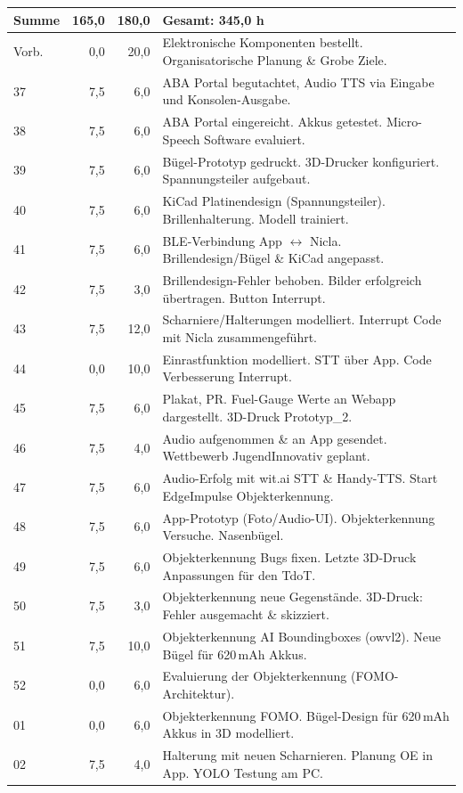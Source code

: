 \begin{longtable}{l r r p{\dimexpr\textwidth-4.5cm\relax}}
\hline
\textbf{Summe} & \textbf{165,0} & \textbf{180,0} & \textbf{Gesamt: 345,0 h} \\
\hline
\hline
\endlastfoot
Vorb. & 0,0 & 20,0 & Elektronische Komponenten bestellt. Organisatorische Planung \& Grobe Ziele. \\
37 & 7,5 & 6,0 & ABA Portal begutachtet, Audio TTS via Eingabe und Konsolen-Ausgabe. \\
38 & 7,5 & 6,0 & ABA Portal eingereicht. Akkus getestet. Micro-Speech Software evaluiert. \\
39 & 7,5 & 6,0 & Bügel-Prototyp gedruckt. 3D-Drucker konfiguriert. Spannungsteiler aufgebaut. \\
40 & 7,5 & 6,0 & KiCad Platinendesign (Spannungsteiler). Brillenhalterung. Modell trainiert. \\
41 & 7,5 & 6,0 & BLE-Verbindung App $\leftrightarrow$ Nicla. Brillendesign/Bügel \& KiCad angepasst. \\
42 & 7,5 & 3,0 & Brillendesign-Fehler behoben. Bilder erfolgreich übertragen. Button Interrupt. \\
43 & 7,5 & 12,0 & Scharniere/Halterungen modelliert. Interrupt Code mit Nicla zusammengeführt. \\
44 & 0,0 & 10,0 & Einrastfunktion modelliert. STT über App. Code Verbesserung Interrupt. \\
45 & 7,5 & 6,0 & Plakat, PR. Fuel-Gauge Werte an Webapp dargestellt. 3D-Druck Prototyp\_2. \\
46 & 7,5 & 4,0 & Audio aufgenommen \& an App gesendet. Wettbewerb JugendInnovativ geplant. \\
47 & 7,5 & 6,0 & Audio-Erfolg mit wit.ai STT \& Handy-TTS. Start EdgeImpulse Objekterkennung. \\
48 & 7,5 & 6,0 & App-Prototyp (Foto/Audio-UI). Objekterkennung Versuche. Nasenbügel. \\
49 & 7,5 & 6,0 & Objekterkennung Bugs fixen. Letzte 3D-Druck Anpassungen für den TdoT. \\
50 & 7,5 & 3,0 & Objekterkennung neue Gegenstände. 3D-Druck: Fehler ausgemacht \& skizziert. \\
51 & 7,5 & 10,0 & Objekterkennung AI Boundingboxes (owvl2). Neue Bügel für 620\,mAh Akkus. \\
52 & 0,0 & 6,0 & Evaluierung der Objekterkennung (FOMO-Architektur). \\
01 & 0,0 & 6,0 & Objekterkennung FOMO. Bügel-Design für 620\,mAh Akkus in 3D modelliert. \\
02 & 7,5 & 4,0 & Halterung mit neuen Scharnieren. Planung OE in App. YOLO Testung am PC. \\

\end{longtable}
